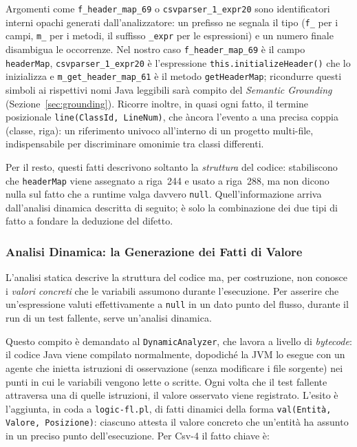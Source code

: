 Argomenti come \texttt{f\_header\_map\_69} o \texttt{csvparser\_1\_expr20} sono identificatori interni opachi
generati dall'analizzatore: un prefisso ne segnala il tipo (\texttt{f\_} per i campi, \texttt{m\_} per i metodi,
il suffisso \texttt{\_expr} per le espressioni) e un numero finale disambigua le occorrenze. Nel nostro caso
\texttt{f\_header\_map\_69} è il campo \texttt{headerMap}, \texttt{csvparser\_1\_expr20} è l'espressione
\texttt{this.initializeHeader()} che lo inizializza e \texttt{m\_get\_header\_map\_61} è il metodo
\texttt{getHeaderMap}; ricondurre questi simboli ai rispettivi nomi Java leggibili sarà compito del
\emph{Semantic Grounding} (Sezione~\ref{sec:grounding}). Ricorre inoltre, in quasi ogni fatto, il termine
posizionale \texttt{line(ClassId, LineNum)}, che àncora l'evento a una precisa coppia (classe, riga): un
riferimento univoco all'interno di un progetto multi-file, indispensabile per discriminare omonimie tra classi
differenti.

Per il resto, questi fatti descrivono soltanto la \emph{struttura} del codice: stabiliscono che
\texttt{headerMap} viene assegnato a riga~244 e usato a riga~288, ma non dicono nulla sul fatto che a runtime
valga davvero \texttt{null}. Quell'informazione arriva dall'analisi dinamica descritta di seguito; è solo la
combinazione dei due tipi di fatto a fondare la deduzione del difetto.

\subsubsection{Analisi Dinamica: la Generazione dei Fatti di Valore}

L'analisi statica descrive la struttura del codice ma, per costruzione, non conosce i \textit{valori concreti}
che le variabili assumono durante l'esecuzione. Per asserire che un'espressione valuti effettivamente a
\texttt{null} in un dato punto del flusso, durante il run di un test fallente, serve un'analisi dinamica.

Questo compito è demandato al \texttt{DynamicAnalyzer}, che lavora a livello di \emph{bytecode}: il codice Java
viene compilato normalmente, dopodiché la JVM lo esegue con un agente che inietta istruzioni di osservazione
(senza modificare i file sorgente) nei punti in cui le variabili vengono lette o scritte. Ogni volta che il
test fallente attraversa una di quelle istruzioni, il valore osservato viene registrato. L'esito è l'aggiunta,
in coda a \texttt{logic-fl.pl}, di fatti dinamici della forma \texttt{val(Entità, Valore, Posizione)}: ciascuno
attesta il valore concreto che un'entità ha assunto in un preciso punto dell'esecuzione. Per Csv-4 il fatto
chiave è:

